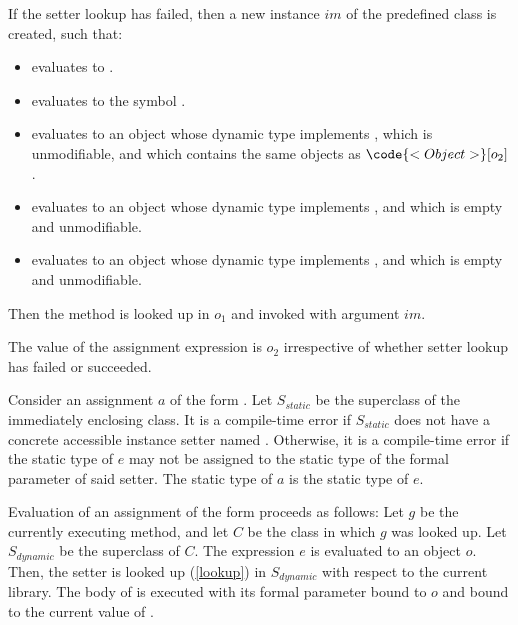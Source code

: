 \documentclass[makeidx]{article}
\begin{document}
{\LMHash{}%
If the setter lookup has failed, then a new instance $im$ of the predefined class  is created, such that:
\begin{itemize}
\item {} evaluates to \TRUE.
\item {} evaluates to the symbol .
\item {} evaluates to an object
  whose dynamic type implements ,
  which is unmodifiable, and which contains the same objects as
  $\code{<Object>}[o_2]$.
\item {} evaluates to an object
  whose dynamic type implements ,
  and which is empty and unmodifiable.
\item {} evaluates to an object
  whose dynamic type implements ,
  and which is empty and unmodifiable.
\end{itemize}

\LMHash{}%
Then the method  is looked up in $o_1$ and invoked with argument $im$.


\LMHash{}%
The value of the assignment expression is $o_2$ irrespective of whether setter lookup has failed or succeeded.
\EndCase

\LMHash{}%
Consider an assignment $a$ of the form .
Let $S_{static}$ be the superclass of the immediately enclosing class.
It is a compile-time error if $S_{static}$ does not have a concrete accessible instance setter named .
Otherwise, it is a compile-time error if the static type of $e$
may not be assigned to the static type of the formal parameter of said setter.
The static type of $a$ is the static type of $e$.

\LMHash{}%
Evaluation of an assignment of the form 
proceeds as follows:
Let $g$ be the currently executing method, and let $C$ be the class in which $g$ was looked up.
Let $S_{dynamic}$ be the superclass of $C$.
The expression $e$ is evaluated to an object $o$.
Then, the setter  is looked up (\ref{lookup}) in $S_{dynamic}$ with respect to the current library.
The body of  is executed with its formal parameter bound to $o$
and \THIS{} bound to the current value of \THIS{}.

}
\end{document}
